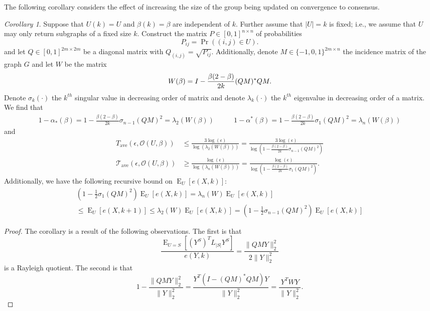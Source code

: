 \documentclass{amsart}
\DeclareMathOperator{\E}{E}
\theoremstyle{remark}
\newtheorem{corollary}{Corollary}
\begin{document}
The following corollary considers the effect of increasing the size of the group being updated on convergence to consensus.
\begin{corollary}{\label{cor:timeHomogeneousComm}}
	Suppose that $U(k) = U$ and $\beta(k) = \beta$ are independent of $k$. Further assume that $|U| = k$ is fixed; i.e., we assume that $U$ may only return subgraphs of a fixed size $k$. Construct the matrix $P\in[0,1]^{n\times n}$ of probabilities 
	\begin{equation}
		P_{ij} = \Pr((i,j)\in U).
	\end{equation}
	and let $Q\in[0,1]^{2m\times 2m}$ be a diagonal matrix with $Q_{(i,j)} = \sqrt{P_{ij}}$. Additionally, denote $M\in\{-1,0,1\}^{2m\times n}$ the incidence matrix of the graph $G$ and let $W$ be the matrix
	\begin{equation}{\label{eq:homogeneousWDefn}}
		W(\beta) = I - \frac{\beta(2-\beta)}{2k}(QM)^*QM.
	\end{equation}
	Denote $\sigma_{k}(\cdot)$ the $k^{th}$ singular value in decreasing order of matrix and denote $\lambda_{k}(\cdot)$ the $k^{th}$ eigenvalue in decreasing order of a matrix. We find that 
	\begin{align}
		1-\alpha_*(\beta) = 1-\frac{\beta(2-\beta)}{2k}\sigma_{n-1}(QM)^2 = \lambda_2(W(\beta))\quad & \quad 1-\alpha^*(\beta) = 1-\frac{\beta(2-\beta)}{2k}\sigma_1(QM)^2 = \lambda_{n}(W(\beta))
	\end{align}
	and
	\begin{align}
		T_{\text{ave}}(\epsilon,\mathcal{O}(U,\beta)) &\leq \frac{3\log(\epsilon)}{\log(\lambda_2(W(\beta)))} = \frac{3\log(\epsilon)}{\log(1-\frac{\beta(2-\beta)}{2k}\sigma_{n-1}(QM)^2)}\\
		\mathcal{T}_{\text{ave}}(\epsilon,\mathcal{O}(U,\beta)) &\geq \frac{\log(\epsilon)}{\log(\lambda_n(W(\beta)))} = \frac{\log(\epsilon)}{\log(1-\frac{\beta(2-\beta)}{2k}\sigma_{1}(QM)^2)}.
	\end{align}
	Additionally, we have the following recursive bound on $\E_U[e(X,k)]$:
	\begin{multline}
		(1-\frac{1}{2}\sigma_{1}(QM)^2)\E_U[e(X,k)] = \lambda_{n}(W)\E_U[e(X,k)] \\\leq \E_U[e(X,k+1)] \leq \lambda_2(W)\E_U[e(X,k)] = (1-\frac{1}{2}\sigma_{n-1}(QM)^2)\E_U[e(X,k)]
	\end{multline}
\end{corollary}
\begin{proof}
	The corollary is a result of the following observations. The first is that
	\begin{equation}
		\frac{\E_{U=S}\left[(Y^S)^TL_{|S|}Y^S\right]}{e(Y,k)} = \frac{\|QMY\|^2_2}{2\|Y\|^2_2}
	\end{equation}
	is a Rayleigh quotient.  The second is that 
	\begin{equation}
		1 - \frac{\|QMY\|^2_2}{\|Y\|^2_2} = \frac{Y^T(I-(QM)^*QM)Y}{\|Y\|^2_2} = \frac{Y^TWY}{\|Y\|_2^2}.
	\end{equation}
\end{proof}
\end{document}
